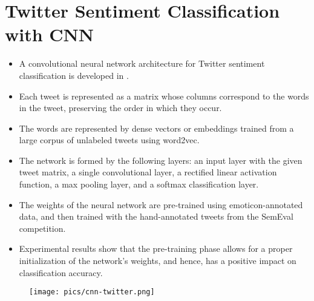 \section{Twitter Sentiment Classification with CNN}
\begin{itemize}
\item A convolutional neural network architecture for Twitter sentiment classification is developed in \cite{Severyn2015}.
\item  Each tweet is represented as a matrix whose columns correspond to the words in the tweet, preserving the order in which they occur.
\item  The words are represented by dense vectors or embeddings trained from a large corpus of unlabeled tweets using word2vec.
\item  The network is formed by the following layers: an input layer with the given tweet matrix, a  single  convolutional layer, a rectified linear activation function, a max pooling layer, and a softmax classification layer.
\item  The weights of the neural network are pre-trained using emoticon-annotated data, and then trained with the hand-annotated tweets from the SemEval competition.
\item   Experimental results show that the pre-training phase allows for a proper initialization of the network's weights, and hence, has a positive impact on classification accuracy. 
\end{itemize}
  \begin{figure}[h]
        	\texttt{[image: pics/cnn-twitter.png]}
        \end{figure}

